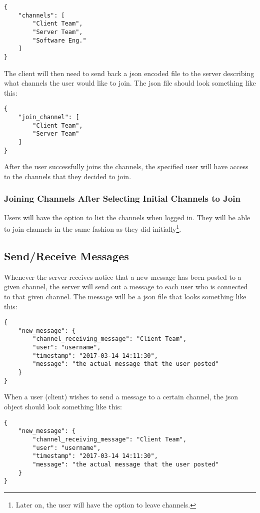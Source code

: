 \begin{lstlisting}[style=json]
{
    "channels": [
        "Client Team",
        "Server Team",
        "Software Eng."
    ]
}
\end{lstlisting}

The client will then need to send back a \gls{json} encoded file to the server describing what channels the user would like to join. The \gls{json} file should look something like this:

\begin{lstlisting}[style=json]
{
    "join_channel": [
        "Client Team",
        "Server Team"
    ]
}
\end{lstlisting}

After the user successfully joins the channels, the specified user will have
access to the channels that they decided to join.

\subsubsection{Joining Channels After Selecting Initial Channels to Join}
Users will have the option to list the channels when logged in. They will be able to join channels in the same fashion as they did initially\footnote{Later on, the user will have the option to leave channels.}.

\subsection{Send/Receive Messages}
Whenever the server receives notice that a new message has been posted to a given channel, the server will send out a message to each user who is connected to that given channel. The message will be a \gls{json} file that looks something like this:

\begin{lstlisting}[style=json]
{
    "new_message": {
        "channel_receiving_message": "Client Team",
        "user": "username",
        "timestamp": "2017-03-14 14:11:30",
        "message": "the actual message that the user posted"
    }
}
\end{lstlisting}

When a user (client) wishes to send a message to a certain channel, the \gls{json} object should look something like this:

\begin{lstlisting}[style=json]
{
    "new_message": {
        "channel_receiving_message": "Client Team",
        "user": "username",
        "timestamp": "2017-03-14 14:11:30",
        "message": "the actual message that the user posted"
    }
}
\end{lstlisting}

